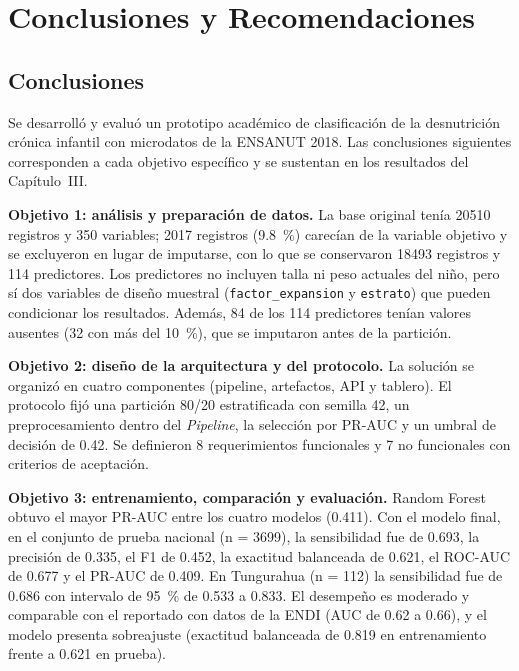 \chapter{Conclusiones y Recomendaciones}

\section{Conclusiones}
Se desarrolló y evaluó un prototipo académico de clasificación de la desnutrición crónica infantil con microdatos de la ENSANUT 2018. Las conclusiones siguientes corresponden a cada objetivo específico y se sustentan en los resultados del Capítulo~III.

\noindent\hspace*{\parindent}\textbf{Objetivo 1: análisis y preparación de datos.} La base original tenía \num{20510} registros y 350 variables; \num{2017} registros (\SI{9.8}{\percent}) carecían de la variable objetivo y se excluyeron en lugar de imputarse, con lo que se conservaron \num{18493} registros y 114 predictores. Los predictores no incluyen talla ni peso actuales del niño, pero sí dos variables de diseño muestral (\texttt{factor\_expansion} y \texttt{estrato}) que pueden condicionar los resultados. Además, 84 de los 114 predictores tenían valores ausentes (32 con más del \SI{10}{\percent}), que se imputaron antes de la partición.

\noindent\hspace*{\parindent}\textbf{Objetivo 2: diseño de la arquitectura y del protocolo.} La solución se organizó en cuatro componentes (pipeline, artefactos, API y tablero). El protocolo fijó una partición 80/20 estratificada con semilla 42, un preprocesamiento dentro del \textit{Pipeline}, la selección por PR-AUC y un umbral de decisión de 0.42. Se definieron 8 requerimientos funcionales y 7 no funcionales con criterios de aceptación.

\noindent\hspace*{\parindent}\textbf{Objetivo 3: entrenamiento, comparación y evaluación.} Random Forest obtuvo el mayor PR-AUC entre los cuatro modelos (0.411). Con el modelo final, en el conjunto de prueba nacional (n = \num{3699}), la sensibilidad fue de 0.693, la precisión de 0.335, el F1 de 0.452, la exactitud balanceada de 0.621, el ROC-AUC de 0.677 y el PR-AUC de 0.409. En Tungurahua (n = 112) la sensibilidad fue de 0.686 con intervalo de \SI{95}{\percent} de 0.533 a 0.833. El desempeño es moderado y comparable con el reportado con datos de la ENDI (AUC de 0.62 a 0.66), y el modelo presenta sobreajuste (exactitud balanceada de 0.819 en entrenamiento frente a 0.621 en prueba).

